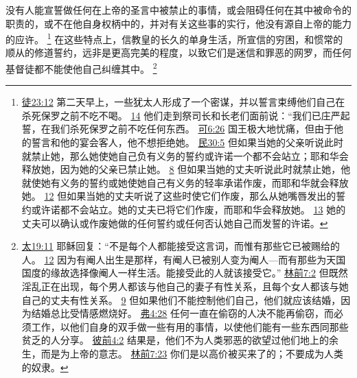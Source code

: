\documentclass[12pt, a4paper, oneside]{ctexart}
\newcounter{parnum}[section]
\newcommand{\N}{%
   \noindent\refstepcounter{parnum}%
    \makebox[\parindent][l]{\textbf{\arabic{parnum}.}}}
\begin{document}
\N 没有人能宣誓做任何在上帝的圣言中被禁止的事情，或会阻碍任何在其中被命令的职责的，或不在他自身权柄中的，并对有关这些事的实行，他没有源自上帝的能力的应许。
	\footnote {
		\href{https://biblehub.com/acts/23-12.htm}{徒23:12} 第二天早上，一些犹太人形成了一个密谋，并以誓言束缚他们自己在杀死保罗之前不吃不喝。
		\href{https://biblehub.com/acts/23-14.htm}{14} 他们走到祭司长和长老们面前说：“我们已庄严起誓，在我们杀死保罗之前不吃任何东西。
		\href{https://biblehub.com/mark/6-26.htm}{可6:26} 国王极大地忧痛，但由于他的誓言和他的宴会客人，他不想拒绝她。
		\href{https://biblehub.com/numbers/30-5.htm}{民30:5} 但如果当她的父亲听说此时就禁止她，那么她使她自己负有义务的誓约或许诺一个都不会站立；耶和华会释放她，因为她的父亲已禁止她。
		\href{https://biblehub.com/numbers/30-8.htm}{8} 但如果当她的丈夫听说此时就禁止她，他就使她有义务的誓约或她使她自己有义务的轻率承诺作废，而耶和华就会释放她。
		\href{https://biblehub.com/numbers/30-12.htm}{12} 但如果当她的丈夫听说了这些时使它们作废，那么从她嘴唇发出的誓约或许诺都不会站立。她的丈夫已将它们作废，而耶和华会释放她。
		\href{https://biblehub.com/numbers/30-13.htm}{13} 她的丈夫可以确认或作废她做的任何誓约或任何否认她自己而发誓的许诺。
	}
	在这些特点上，信教皇的长久的单身生活，所宣信的穷困，和惯常的顺从的修道誓约，远非是更高完美的程度，以致它们是迷信和罪恶的网罗，而任何基督徒都不能使他自己纠缠其中。
	\footnote {
		\href{https://biblehub.com/matthew/19-11.htm}{太19:11} 耶稣回复：“不是每个人都能接受这言词，而惟有那些它已被赐给的人。
		\href{https://biblehub.com/matthew/19-12.htm}{12} 因为有阉人出生是那样，有阉人已被别人变为阉人---而有那些为天国国度的缘故选择像阉人一样生活。能接受此的人就该接受它。”
		\href{https://biblehub.com/1_corinthians/7-2.htm}{林前7:2} 但既然淫乱正在出现，每个男人都该与他自己的妻子有性关系，且每个女人都该与她自己的丈夫有性关系。
		\href{https://biblehub.com/1_corinthians/7-9.htm}{9} 但如果他们不能控制他们自己，他们就应该结婚，因为结婚总比受情感燃烧好。
		\href{https://biblehub.com/ephesians/4-28.htm}{弗4:28} 任何一直在偷窃的人决不能再偷窃，而必须工作，以他们自身的双手做一些有用的事情，以使他们能有一些东西同那些贫乏的人分享。
		\href{https://biblehub.com/1_peter/4-2.htm}{彼前4:2} 结果是，他们不为人类邪恶的欲望过他们地上的余生，而是为上帝的意志。
		\href{https://biblehub.com/1_corinthians/7-23.htm}{林前7:23} 你们是以高价被买来了的；不要成为人类的奴隶。
	}
\end{document}
